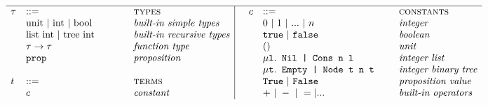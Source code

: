 	\begin{figure}[H]
		\begin{adjustwidth}{-7em}{-3em}
		\begin{displaymath}
		\hrulefill
		\begin{array}{ll@{\hspace*{-0.1cm}}
							 l@{\hspace*{1.5cm} }
							 l|@{\hspace*{0.5cm}}
							 llll}
	\hline		

  \tau & ::= 
  & & \textsc{types} &  
  
  c & ::= 
	& & \textsc{constants} \\



	& \text{unit }| \text{ int }| \text{ bool} 
	& & \textit{built-in simple types} &
	
	&     0 ~|~ 1 ~|~ ... ~|~ n        
	& & \textit{integer} \\    
	
	
	
	& \text{list int }	| \text{ tree int} 
	& & \textit{built-in recursive types} &
	
	&   \mathtt{true}~|~\mathtt{false} 
  & & \textit{boolean} \\ 
	
	
	
	& \tau \rightarrow \tau 
	& & \textit{function type} &

	&  () 
	& & \textit{unit} \\  	
	
	

  & \mathtt{prop} 
  & & \textit{proposition} & 

  & \mu \mathtt{l}. \texttt{ Nil | Cons n l }
  & &  \textit{integer list}  \\ 
  
  

	& \ 
	& & \ &
	
	& \mu \mathtt{t}. \texttt{ Empty | Node t n t }
  & &  \textit{integer binary tree}  \\ 
	
	

	t & ::= 
	& & \textsc{terms} & 
	
	& \mathtt{True} ~|~ \mathtt{False} 
	& & \textit{proposition value} \\



	& c
	& & \textit{constant} &
	
	&  + ~|~ - ~|~ = | ... 
	& & \textit{built-in operators} \\




\end{array}
\end{displaymath}
\end{adjustwidth}
\end{figure}

